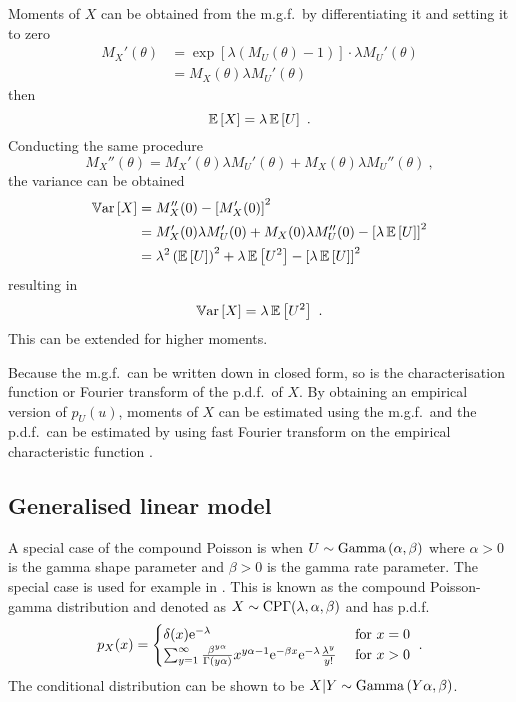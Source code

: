 Moments of $X$ can be obtained from the m.g.f.~by differentiating it and setting it to zero
\begin{align}
  M_X'(\theta)&=\exp\left[\lambda\left(M_U(\theta)-1\right)\right]\cdot\lambda M_U'(\theta) \\
  &=M_X(\theta)\lambda M_U'(\theta)
\end{align}
then
\begin{equation}
  \operatorname{\mathbb{E}}\left[X\right]=\lambda\operatorname{\mathbb{E}}\left[U\right]
  \ .
\end{equation}
Conducting the same procedure
\begin{equation}
  M_X''(\theta)=M_X'(\theta)\lambda M_U'(\theta)+M_X(\theta)\lambda M_U''(\theta)
  \ ,
\end{equation}
the variance can be obtained
\begin{align}
  \operatorname{\mathbb{V}ar}\left[X\right]&=M_X''(0)-\left[M_X'(0)\right]^2
  \\
  &=M_X'(0)\lambda M_U'(0)+M_X(0)\lambda M_U''(0)-\left[\lambda\operatorname{\mathbb{E}}\left[U\right]\right]^2
  \\
  &=\lambda^2 \left(\operatorname{\mathbb{E}}\left[U\right]\right)^2+\lambda \operatorname{\mathbb{E}}\left[U^2\right]-\left[\lambda\operatorname{\mathbb{E}}\left[U\right]\right]^2
\end{align}
resulting in
\begin{equation}
  \operatorname{\mathbb{V}ar}\left[X\right] = \lambda\operatorname{\mathbb{E}}\left[U^2\right]
  \ .
\end{equation}
This can be extended for higher moments.

Because the m.g.f.~can be written down in closed form, so is the characterisation function or Fourier transform of the p.d.f.~of $X$. By obtaining an empirical version of $p_U(u)$, moments of $X$ can be estimated using the m.g.f.~and the p.d.f.~can be estimated by using fast Fourier transform on the empirical characteristic function \citep{whiting2006properties}.

\subsection{Generalised linear model}

A special case of the compound Poisson is when $U\sim\operatorname{Gamma}\left(\alpha,\beta\right)$ where $\alpha>0$ is the gamma shape parameter and $\beta>0$ is the gamma rate parameter. The special case is used for example in \cite{xu2009electronic}. This is known as the compound Poisson-gamma distribution and denoted as $X\sim\operatorname{CP\Gamma}(\lambda,\alpha,\beta)$ and has p.d.f.
\begin{equation}
  p_X(x) = 
  \begin{cases}
    \delta(x) \mathrm{e}^{-\lambda} & \text{ for } x=0 \\ 
    \sum_{y=1}^{\infty}\frac{\beta^{y\alpha}}{\Gamma(y\alpha)}x^{y\alpha-1}\mathrm{e}^{-\beta x}\mathrm{e}^{-\lambda}\frac{\lambda^y}{y!} & \text{ for } x>0
  \end{cases}
  \ .
  \label{eq:compoundPoisson_pdf}
\end{equation}
The conditional distribution can be shown to be $X|Y\sim\operatorname{Gamma}\left(Y\alpha,\beta\right)$.

